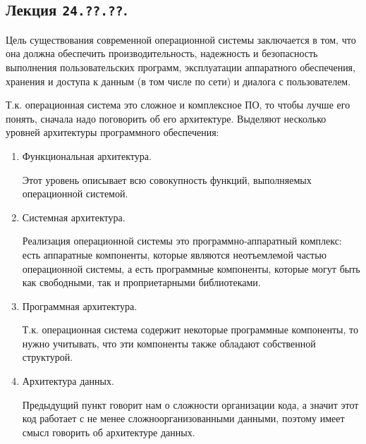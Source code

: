 \subsection{%
  Лекция \texttt{24.??.??}.%
}

Цель существования современной операционной системы заключается в том, что она
должна обеспечить производительность, надежность и безопасность выполнения
пользовательских программ, эксплуатации аппаратного обеспечения, хранения и
доступа к данным (в том числе по сети) и диалога с пользователем.

Т.к. операционная система это сложное и комплексное ПО, то чтобы лучше его
понять, сначала надо поговорить об его архитектуре. Выделяют несколько уровней
архитектуры программного обеспечения:

\begin{enumerate}
\item
  Функциональная архитектура.
  
  Этот уровень описывает всю совокупность функций, выполняемых операционной
  системой.

\item
  Системная архитектура.

  Реализация операционной системы это программно-аппаратный комплекс: есть
  аппаратные компоненты, которые являются неотъемлемой частью операционной
  системы, а есть программные компоненты, которые могут быть как свободными, так
  и проприетарными библиотеками. 

\item
  Программная архитектура.

  Т.к. операционная система содержит некоторые программные компоненты, то нужно
  учитывать, что эти компоненты также обладают собственной структурой.

\item
  Архитектура данных.

  Предыдущий пункт говорит нам о сложности организации кода, а значит этот код
  работает с не менее сложноорганизованными данными, поэтому имеет смысл
  говорить об архитектуре данных.
\end{enumerate}


